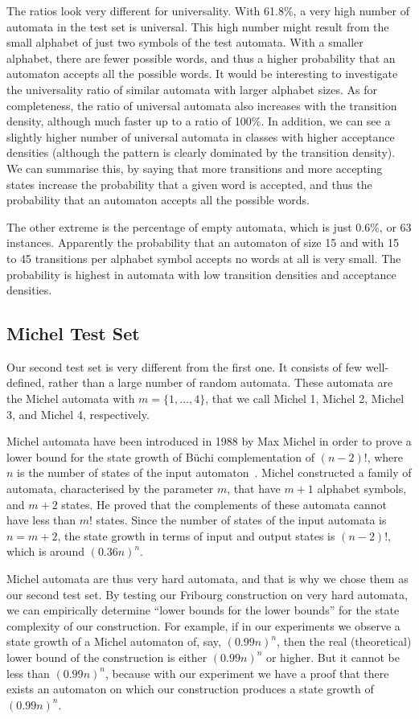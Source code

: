 The ratios look very different for universality. With 61.8\%, a very high number of automata in the test set is universal. This high number might result from the small alphabet of just two symbols of the test automata. With a smaller alphabet, there are fewer possible words, and thus a higher probability that an automaton accepts all the possible words. It would be interesting to investigate the universality ratio of similar automata with larger alphabet sizes. As for completeness, the ratio of universal automata also increases with the transition density, although much faster up to a ratio of 100\%. In addition, we can see a slightly higher number of universal automata in classes with higher acceptance densities (although the pattern is clearly dominated by the transition density). We can summarise this, by saying that more transitions and more accepting states increase the probability that a given word is accepted, and thus the probability that an automaton accepts all the possible words.

The other extreme is the percentage of empty automata, which is just 0.6\%, or 63 instances. Apparently the probability that an automaton of size 15 and with 15 to 45 transitions per alphabet symbol accepts no words at all is very small. The probability is highest in automata with low transition densities and acceptance densities. 


\subsection{Michel Test Set}
Our second test set is very different from the first one. It consists of few well-defined, rather than a large number of random automata. These automata are the Michel automata with $m=\{1,\dots,4\}$, that we call Michel 1, Michel 2, Michel 3, and Michel 4, respectively.

Michel automata have been introduced in 1988 by Max Michel in order to prove a lower bound for the state growth of Büchi complementation of $(n-2)!$, where $n$ is the number of states of the input automaton~\cite{michel1988}\cite{1996_thomas}. Michel constructed a family of automata, characterised by the parameter $m$, that have $m+1$ alphabet symbols, and $m+2$ states. He proved that the complements of these automata cannot have less than $m!$ states. Since the number of states of the input automata is $n = m + 2$, the state growth in terms of input and output states is $(n-2)!$, which is around $(0.36n)^n$.

Michel automata are thus very hard automata, and that is why we chose them as our second test set. By testing our Fribourg construction on very hard automata, we can empirically determine ``lower bounds for the lower bounds'' for the state complexity of our construction. For example, if in our experiments we observe a state growth of a Michel automaton of, say, $(0.99n)^n$, then the real (theoretical) lower bound of the construction is either $(0.99n)^n$ or higher. But it cannot be less than $(0.99n)^n$, because with our experiment we have a proof that there exists an automaton on which our construction produces a state growth of $(0.99n)^n$.

